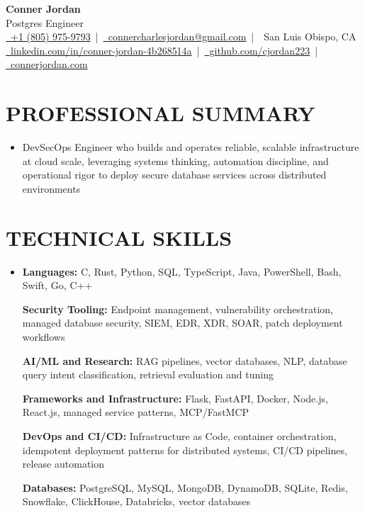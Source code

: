 \documentclass[letterpaper,10pt]{article}
\newcommand{\resumeSubHeadingListStart}{\begin{itemize}[leftmargin=0in,label={}]}
\newcommand{\resumeSubHeadingListEnd}{\end{itemize}}
\begin{document}
\begin{center}
  {\Huge \textbf{Conner Jordan}}\\[0pt]
  {\Large Postgres Engineer}\\[0pt]
  \href{tel:+18059759793}{\faPhone\ +1 (805) 975-9793} \,|\, 
  \href{mailto:connercharlesjordan@gmail.com}{\faEnvelope\ connercharlesjordan@gmail.com} \,|\, 
  \faMapMarker\ San Luis Obispo, CA \\[-2pt]
  \href{https://www.linkedin.com/in/conner-jordan-4b268514a/}{\faLinkedin\ linkedin.com/in/conner-jordan-4b268514a}
  \,|\, \href{https://github.com/cjordan223}{\faGithub\ github.com/cjordan223}
  \,|\, \href{https://connerjordan.com/}{\faGlobe\ connerjordan.com}
\end{center}

\vspace{4pt}

\section{PROFESSIONAL SUMMARY}
\vspace{8pt}
\resumeSubHeadingListStart
\item {\small
DevSecOps Engineer who builds and operates reliable, scalable infrastructure at cloud scale, leveraging systems thinking, automation discipline, and operational rigor to deploy secure database services across distributed environments}
\resumeSubHeadingListEnd
\vspace{6pt}

\section{TECHNICAL SKILLS}
\vspace{6pt}
\resumeSubHeadingListStart
\item {\small
\textbf{Languages:} C, Rust, Python, SQL, TypeScript, Java, PowerShell, Bash, Swift, Go, C++

\vspace{3pt}
\textbf{Security Tooling:} Endpoint management, vulnerability orchestration, managed database security, SIEM, EDR, XDR, SOAR, patch deployment workflows

\vspace{3pt}
\textbf{AI/ML and Research:} RAG pipelines, vector databases, NLP, database query intent classification, retrieval evaluation and tuning

\vspace{3pt}
\textbf{Frameworks and Infrastructure:} Flask, FastAPI, Docker, Node.js, React.js, managed service patterns, MCP/FastMCP

\vspace{3pt}
\textbf{DevOps and CI/CD:} Infrastructure as Code, container orchestration, idempotent deployment patterns for distributed systems, CI/CD pipelines, release automation

\vspace{3pt}
\textbf{Databases:} PostgreSQL, MySQL, MongoDB, DynamoDB, SQLite, Redis, Snowflake, ClickHouse, Databricks, vector databases
}
\resumeSubHeadingListEnd
\vspace{6pt}
\end{document}
